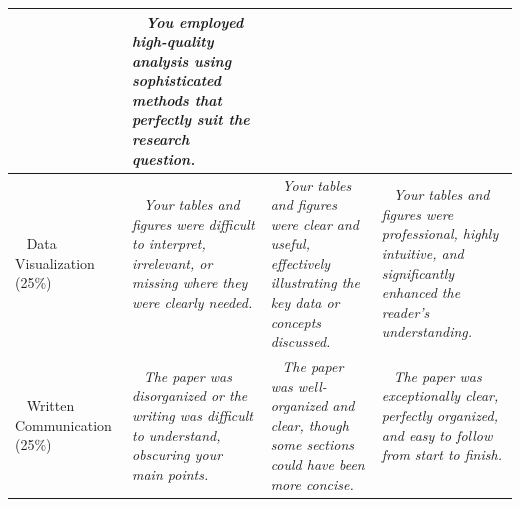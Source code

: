 \documentclass{article}
\begin{document}
\begin{tabular}{|>{\centering\arraybackslash}p{4cm}|>{\centering\arraybackslash}p{4.5cm}|>{\centering\arraybackslash}p{4.5cm}|>{\centering\arraybackslash}p{4.5cm}|}
          \newline ~ & ~ \newline
          \it You employed high-quality analysis using sophisticated methods that perfectly suit the research question.
          \newline ~\\
        \hline
        ~ \newline
        Data Visualization \newline (25\%)
          \newline ~ & ~ \newline
          \it Your tables and figures were difficult to interpret, irrelevant, or missing where they were clearly needed.
          \newline ~ & ~ \newline
          \it Your tables and figures were clear and useful, effectively illustrating the key data or concepts discussed.
          \newline ~ & ~ \newline
          \it Your tables and figures were professional, highly intuitive, and significantly enhanced the reader's understanding.
          \newline ~\\
        \hline
        ~ \newline
        Written Communication \newline (25\%)
          \newline ~ & ~ \newline
          \it The paper was disorganized or the writing was difficult to understand, obscuring your main points.
          \newline ~ & ~ \newline
          \it The paper was well-organized and clear, though some sections could have been more concise.
          \newline ~ & ~ \newline
          \it The paper was exceptionally clear, perfectly organized, and easy to follow from start to finish.
          \newline ~\\
        \hline
      \end{tabular}
    \vspace{5mm}
\end{document}
